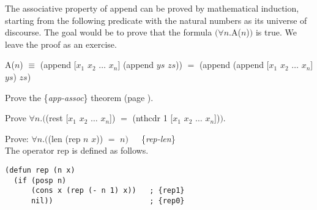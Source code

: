 The associative property of append can be proved by mathematical induction,
starting from the following predicate with the natural numbers as its
universe of discourse.
The goal would be to prove that the formula $(\forall n.$A($n$)$)$ is true.
We leave the proof as an exercise.

\begin{samepage}
\begin{center}
A($n$) $\equiv$ \textsf{(append [$x_1$ $x_2$ $\dots$ $x_n$] (append $ys$ $zs$))} $=$ \textsf{(append (append [$x_1$ $x_2$ $\dots$ $x_n$] $ys$) $zs$)}
\end{center}
\end{samepage}

\begin{ExerciseList}

\Exercise Prove the \{\emph{app-assoc}\} theorem (page \pageref{app-assoc}).

\Exercise Prove $\forall n.($\textsf{(rest [$x_1$ $x_2$ $\dots$ $x_n$])} $=$ \textsf{(nthcdr 1 [$x_1$ $x_2$ $\dots$ $x_n$])}$)$.

\Exercise\label{rep-len}
Prove: $\forall n.($\textsf{(len (rep $n$ $x$))} $=$ $n)$~~~\{\emph{rep-len}\}\\
The operator \textsf{rep} is defined as follows.
\label{rep-equations}
\begin{Verbatim}
(defun rep (n x)
  (if (posp n)
      (cons x (rep (- n 1) x))   ; {rep1}
      nil))                      ; {rep0}
\end{Verbatim}


\end{ExerciseList}
